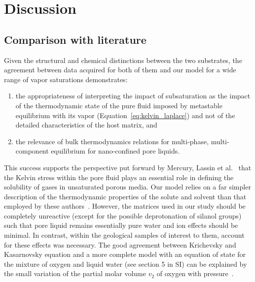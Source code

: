 \documentclass[aps,prl,twocolumn,superscriptaddress,groupedaddress]{revtex4}
\begin{document}
\section{Discussion}

\subsection{Comparison with literature}

Given the structural and chemical distinctions between the two substrates, the agreement between data acquired for both of them and our model for a wide range of vapor saturations demonstrates:
\begin{enumerate}
\item the appropriateness of interpreting the impact of subsaturation as the impact of the thermodynamic state of the pure fluid imposed by metastable equilibrium with its vapor (Equation~\eqref{eq:kelvin_laplace}) and not of the detailed characteristics of the host matrix, and
\item the relevance of bulk thermodynamics relations for multi-phase, multi-component equilibrium for nano-confined pore liquids.
\end{enumerate}

This success supports the perspective put forward by Mercury, Lassin et al.~\cite{mercury_2003,mercury_2004,lassin_2005,lassin_2013,lassin_2016} that the Kelvin stress within the pore fluid plays an essential role in defining the solubility of gases in unsaturated porous media. Our model relies on a far simpler description of the thermodynamic properties of the solute and solvent than that employed by these authors~\cite{helgeson_1981,lassin_2016}. However, the matrices used in our study should be completely unreactive (except for the possible deprotonation of silanol groups) such that pore liquid remains essentially pure water and ion effects should be minimal. In contrast, within the geological samples of interest to them, account for these effects was necessary. The good agreement between Krichevsky and Kasarnovsky equation and a more complete model with an equation of state for the mixture of oxygen and liquid water (see section 5 in SI) can be explained by the small variation of the partial molar volume $v_2$ of oxygen with pressure~\cite{mercury_2003}.

\end{document}
